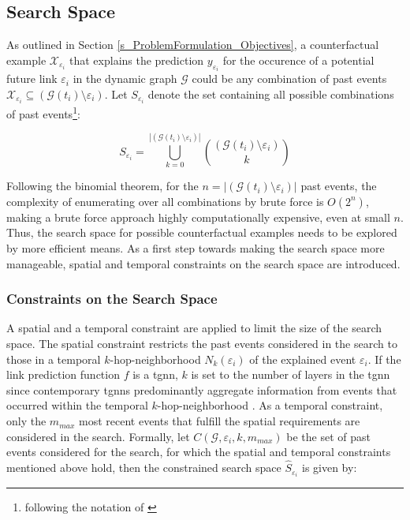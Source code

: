\subsection{Search Space}
\label{s_Methodology_SearchSpace}



As outlined in Section \ref{s_ProblemFormulation_Objectives}, a counterfactual example $\mathcal{X}_{\varepsilon_i}$ that explains the prediction $y_{\varepsilon_i}$ for the occurence of a potential future link $\varepsilon_i$ in the dynamic graph $\mathcal{G}$ could be any combination of past events $\mathcal{X}_{\varepsilon_i} \subseteq (\mathcal{G}(t_i) \setminus \varepsilon_i)$. Let $S_{\varepsilon_i}$ denote the set containing all possible combinations of past events\footnote{following the notation of \cite{stanley_enumerative_1986}}:

\begin{equation}
    S_{\varepsilon_i} = \bigcup_{k = 0}^{|(\mathcal{G}(t_i) \setminus \varepsilon_i)|} {(\mathcal{G}(t_i) \setminus \varepsilon_i) \choose k}
\end{equation}

Following the binomial theorem, for the $n = |(\mathcal{G}(t_i) \setminus \varepsilon_i)|$ past events, the complexity of enumerating over all combinations by brute force is $O(2^n)$, making a brute force approach highly computationally expensive, even at small $n$. Thus, the search space for possible counterfactual examples needs to be explored by more efficient means. As a first step towards making the search space more manageable, spatial and temporal constraints on the search space are introduced. 

\subsubsection{Constraints on the Search Space}
\label{s_Methodology_SearchSpace_Constraints}
A spatial and a temporal constraint are applied to limit the size of the search space. The spatial constraint restricts the past events considered in the search to those in a temporal $k$-hop-neighborhood $N_k(\varepsilon_i)$ of the explained event $\varepsilon_i$. If the link prediction function $f$ is a \gls{tgnn}, $k$ is set to the number of layers in the \gls{tgnn} since contemporary \glspl{tgnn} predominantly aggregate information from events that occurred within the temporal $k$-hop-neighborhood \cite{yuan_explainability_2021}. As a temporal constraint, only the $m_{max}$ most recent events that fulfill the spatial requirements are considered in the search. Formally, let $C(\mathcal{G}, \varepsilon_i, k, m_{max})$ be the set of past events considered for the search, for which the spatial and temporal constraints mentioned above hold, then the constrained search space $\hat{S}_{\varepsilon_i}$ is given by:


